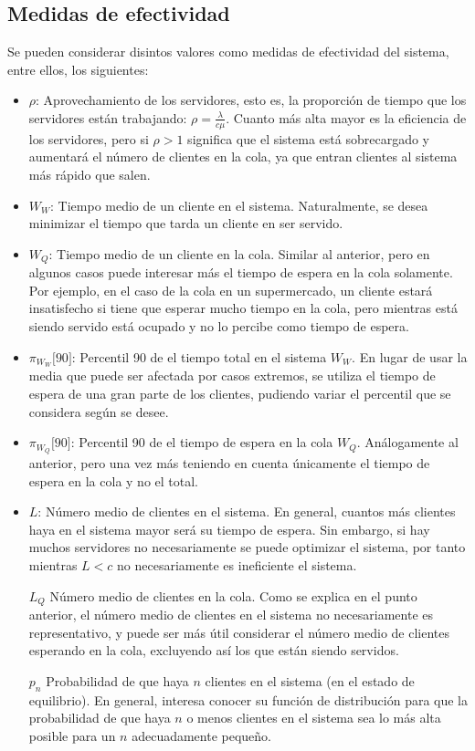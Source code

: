 \documentclass[a4paper,10pt]{scrartcl}
\theoremstyle{definition}
\numberwithin{equation}{section}
\begin{document}
\subsection{Medidas de efectividad}
Se pueden considerar disintos valores como medidas de efectividad del sistema, entre ellos, los siguientes:
\begin{itemize}
\item $\rho$:
  Aprovechamiento de los servidores, esto es, la proporción de tiempo que los servidores están trabajando: $\rho = \frac{\lambda}{c\mu}$. Cuanto más alta mayor es la eficiencia de los servidores, pero si $\rho > 1$ significa que el sistema está sobrecargado y aumentará el número de clientes en la cola, ya que entran clientes al sistema más rápido que salen.
\item $W_W$:
  Tiempo medio de un cliente en el sistema. Naturalmente, se desea minimizar el tiempo que tarda un cliente en ser servido.
\item $W_Q$:
  Tiempo medio de un cliente en la cola. Similar al anterior, pero en algunos casos puede interesar más el tiempo de espera en la cola solamente. Por ejemplo, en el caso de la cola en un supermercado, un cliente estará insatisfecho si tiene que esperar mucho tiempo en la cola, pero mientras está siendo servido está ocupado y no lo percibe como tiempo de espera.
\item $\pi_{W_W} \lbrack 90 \rbrack$:
  Percentil 90 de el tiempo total en el sistema $W_W$. En lugar de usar la media que puede ser afectada por casos extremos, se utiliza el tiempo de espera de una gran parte de los clientes, pudiendo variar el percentil que se considera según se desee.
\item $\pi_{W_Q} \lbrack 90 \rbrack$:
  Percentil 90 de el tiempo de espera en la cola $W_Q$. Análogamente al anterior, pero una vez más teniendo en cuenta únicamente el tiempo de espera en la cola y no el total.
\item $L$:
  Número medio de clientes en el sistema. En general, cuantos más clientes haya en el sistema mayor será su tiempo de espera. Sin embargo, si hay muchos servidores no necesariamente se puede optimizar el sistema, por tanto mientras $L<c$ no necesariamente es ineficiente el sistema.
\item [$L_Q$]
  Número medio de clientes en la cola. Como se explica en el punto anterior, el número medio de clientes en el sistema no necesariamente es representativo, y puede ser más útil considerar el número medio de clientes esperando en la cola, excluyendo así los que están siendo servidos.
\item [$p_n$]
  Probabilidad de que haya $n$ clientes en el sistema (en el estado de equilibrio). En general, interesa conocer su función de distribución para que la probabilidad de que haya $n$ o menos clientes en el sistema sea lo más alta posible para un $n$ adecuadamente pequeño.
\end{itemize}
\end{document}
